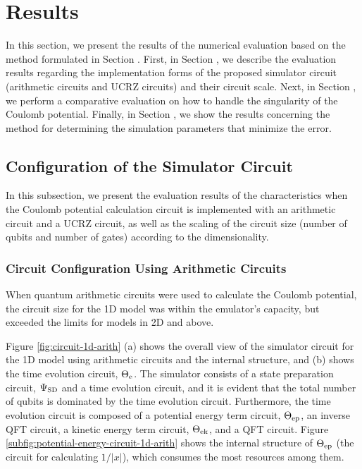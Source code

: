 \documentclass[jctc-draft.tex]{subfiles}
\begin{document}
\section{Results}
In this section, we present the results of the numerical evaluation based on the
method formulated in Section . First, in Section
, we describe the evaluation results
regarding the implementation forms of the proposed simulator circuit (arithmetic
circuits and UCRZ circuits) and their circuit scale. Next, in Section
, we perform a comparative
evaluation on how to handle the singularity of the Coulomb potential. Finally,
in Section , we show
the results concerning the method for determining the simulation parameters that
minimize the error.

\subsection{Configuration of the Simulator Circuit}
\label{subsec:circuit-configuration-results}
In this subsection, we present the evaluation results of the characteristics
when the Coulomb potential calculation circuit is implemented with an arithmetic
circuit and a UCRZ circuit, as well as the scaling of the circuit size (number
of qubits and number of gates) according to the dimensionality.

\subsubsection{Circuit Configuration Using Arithmetic Circuits}
\label{subsubsec:arithmetic-circuit-configuration-results}
When quantum arithmetic circuits were used to calculate the Coulomb potential,
the circuit size for the 1D model was within the emulator's capacity, but
exceeded the limits for models in 2D and above.

Figure \ref{fig:circuit-1d-arith} (a) shows the overall view of the simulator
circuit for the 1D model using arithmetic circuits and the internal structure,
and (b) shows the time evolution circuit, $\Theta_{\mathrm{e}}$. The simulator consists of a
state preparation circuit, $\Psi_{\mathrm{SD}}$ and a time evolution circuit, and it is
evident that the total number of qubits is dominated by the time evolution
circuit. Furthermore, the time evolution circuit is composed of a potential
energy term circuit, $\Theta_{\mathrm{ep}}$, an inverse QFT circuit, a kinetic energy term
circuit, $\Theta_{\mathrm{ek}}$, and a QFT circuit. Figure
\ref{subfig:potential-energy-circuit-1d-arith} shows the internal structure of
$\Theta_{\mathrm{ep}}$ (the circuit for calculating $1/|x|$), which consumes the most
resources among them.
\end{document}
